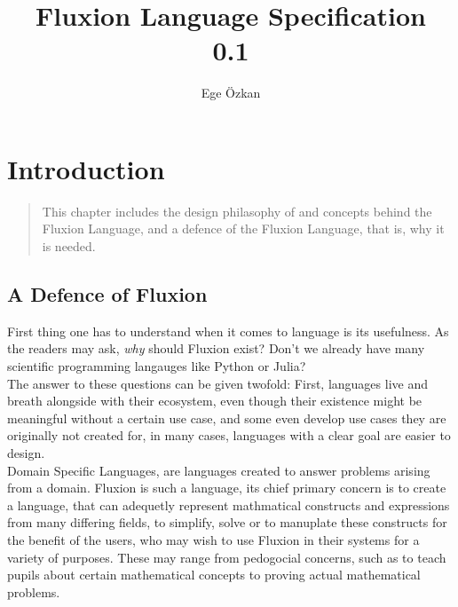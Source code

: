 \documentclass[11pt,a4paper]{book}
\author{Ege Özkan}
\title{Fluxion Language Specification \\ \large{0.1}}
\begin{document}
\newcommand{\diff}[2]{\ensuremath{\frac{\text{d}}{\text{d}#1} \left(#2\right)}}
\newcommand{\sdif}[2]{\ensuremath{\frac{\text{d}#1}{\text{d}#2}}}
\newcommand{\pdif}[2]{\ensuremath{\frac{\partial}{\partial #1} \left(#2\right)}}
\newcommand{\spdif}[2]{\ensuremath{\frac{\partial #1}{\partial #2}}}
\newcommand{\term}[1]{\ensuremath{\left(#1\right)}}
\newcommand{\oftype}{\ensuremath{\in^\text{T}}}
\newcommand{\intx}[1]{\ensuremath{\int \left(#1\right) \text{d}x}}
\newcommand{\stirling}[2]{\ensuremath{\begin{Bmatrix}#1 \\ #2\end{Bmatrix}}}
\frontmatter
\maketitle



\tableofcontents
\newpage


\chapter{Introduction}
\vspace{1em}
\begin{quotation}
This chapter includes the design philasophy of and concepts behind the Fluxion Language, and a defence of the Fluxion Language, that is, why it is needed.
\end{quotation}

\newpage
\section{A Defence of Fluxion}

First thing one has to understand when it comes to language is its usefulness. As the readers may ask, \textit{why} should Fluxion exist? Don't we already have many scientific programming langauges like Python or Julia?\\

The answer to these questions can be given twofold: First, languages live and breath alongside with their ecosystem, even though their existence might be meaningful without a certain use case, and some even develop use cases they are originally not created for, in many cases, languages with a clear goal are easier to design.\\

Domain Specific Languages, are languages created to answer problems arising from a domain. Fluxion is such a language, its chief primary concern is to create a language, that can adequetly represent mathmatical constructs and expressions from many differing fields, to simplify, solve or to manuplate these constructs for the benefit of the users, who may wish to use Fluxion in their systems for a variety of purposes. These may range from pedogocial concerns, such as to teach pupils about certain mathematical concepts to proving actual mathematical problems.\\
\end{document}
